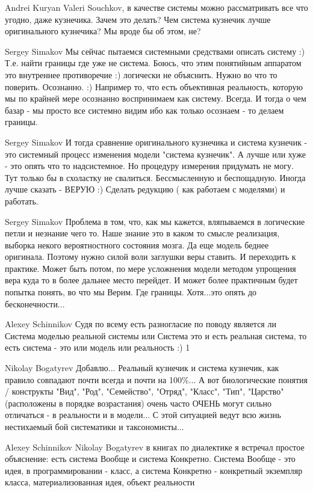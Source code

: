 \documentclass[11pt,a4paper]{article}
\begin{document}
Andrei Kuryan Valeri Souchkov, в качестве системы можно рассматривать все что
угодно, даже кузнечика. Зачем это делать? Чем система кузнечик лучше
оригинального кузнечика? Мы вроде бы об этом, не?

Sergey Simakov Мы сейчас пытаемся системными средствами описать систему :)
Т.е. найти границы где уже не система.  Боюсь, что этим понятийным аппаратом
это внутреннее противоречие :) логически не объяснить.  Нужно во что то
поверить. Осознанно. :) Например то, что есть объективная реальность, которую
мы по крайней мере осознанно воспринимаем как систему. Всегда. И тогда о чем
базар - мы просто все системно видим ибо как только осознаем - то делаем
границы.

Sergey Simakov И тогда сравнение оригинального кузнечика и система кузнечик -
это системный процесс изменения модели "система кузнечик". А лучше или хуже -
это опять что то надсистемное. Но процедуру измерения придумать не могу.  Тут
только бы в схоластку не свалиться. Бессмысленную и беспощадную.  Иногда лучше
сказать - ВЕРУЮ :) Сделать редукцию ( как работаем с моделями) и работать.

Sergey Simakov Проблема в том, что, как мы кажется, вляпываемся в логические
петли и незнание чего то. Наше знание это в каком то смысле реализация,
выборка некого вероятностного состояния мозга. Да еще модель беднее
оригинала. Поэтому нужно силой воли заглушки веры ставить. И переходить к
практике. Может быть потом, по мере усложнения модели методом упрощения вера
куда то в более дальнее место перейдет.  И может более практичным будет
попытка понять, во что мы Верим. Где границы. Хотя...это опять до
бесконечности...

Alexey Schinnikov Судя по всему есть разногласие по поводу является ли Система
моделью реальной системы или Система это и есть реальная система, то есть
система - это или модель или реальность :) 1

Nikolay Bogatyrev Добавлю... Реальный кузнечик и система кузнечик, как правило
совпадают почти всегда и почти на 100\%... А вот биологические понятия /
конструкты "Вид", "Род", "Семейство", "Отряд", "Класс", "Тип", "Царство"
(расположены в порядке возрастания) очень часто ОЧЕНЬ могут сильно отличаться
- в реальности и в модели... С этой ситуацией ведут всю жизнь нестихаемый бой
систематики и таксономисты...

Alexey Schinnikov Nikolay Bogatyrev в книгах по диалектике я встречал простое
объяснение: есть система Вообще и система Конкретно. Система Вообще - это
идея, в программировании - класс, а система Конкретно - конкретный экземпляр
класса, материализованная идея, объект реальности
\end{document}
